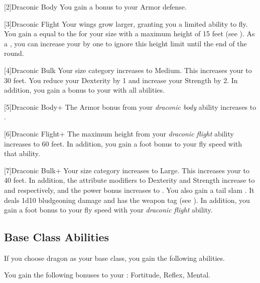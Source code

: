        [2]{Draconic Body} You gain a  bonus to your Armor defense.

        [3]{Draconic Flight} Your wings grow larger, granting you a limited ability to fly.
        You gain a  equal to the  for your size with a maximum height of 15 feet (see ).
        As a , you can increase your  by one to ignore this height limit until the end of the round.

        [4]{Draconic Bulk} Your size category increases to Medium.
        This increases your  to 30 feet.
        You reduce your Dexterity by 1 and increase your Strength by 2.
        In addition, you gain a  bonus to your  with all abilities.

        [5]{Draconic Body+} The Armor bonus from your \textit{draconic body} ability increases to .

        [6]{Draconic Flight+} The maximum height from your \textit{draconic flight} ability increases to 60 feet.
        In addition, you gain a  foot bonus to your fly speed with that ability.

        [7]{Draconic Bulk+} Your size category increases to Large.
        This increases your  to 40 feet.
        In addition, the attribute modifiers to Dexterity and Strength increase to  and  respectively, and the power bonus increases to .
        You also gain a tail slam .
        It deals 1d10 bludgeoning damage and has the  weapon tag (see ).
        In addition, you gain a  foot bonus to your fly speed with your \textit{draconic flight} ability.

    \subsection{Base Class Abilities}
        If you choose dragon as your base class, you gain the following abilities.

        You gain the following bonuses to your :  Fortitude,  Reflex,  Mental.

